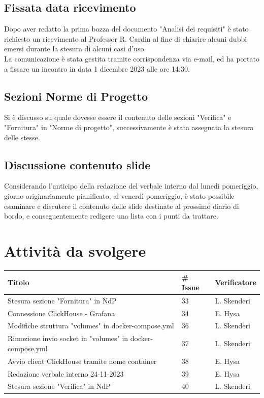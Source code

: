 \documentclass{article}
\begin{document}
    \subsection{Fissata data ricevimento}
        Dopo aver redatto la prima bozza del documento "Analisi dei requisiti" è stato richiesto un ricevimento al Professor R. Cardin al fine di chiarire alcuni dubbi emersi durante la stesura di alcuni casi d'uso. \\
        La comunicazione è stata gestita tramite corrispondenza via e-mail, ed ha portato a fissare un incontro in data 1 dicembre 2023 alle ore 14:30.

    \subsection{Sezioni Norme di Progetto}
        Si è discusso su quale dovesse essere il contenuto delle sezioni "Verifica" e "Fornitura" in "Norme di progetto", successivamente è stata assegnata la stesura delle stesse.
    
    \subsection{Discussione contenuto slide}
        Considerando l'anticipo della redazione del verbale interno dal lunedì pomeriggio, giorno originariamente pianificato, al venerdì pomeriggio, è stato possibile esaminare e discutere il contenuto delle slide destinate al prossimo diario di bordo, e conseguentemente redigere una lista con i punti da trattare.
        
\section{Attività da svolgere}
    \begin{center}
        \begin{tabular}{|C{7cm}|C{1,5cm}|C{3cm}|}
            \hline
            \textbf{Titolo} & \textbf{\# Issue} & \textbf{Verificatore} \\
            \hline\hline
            Stesura sezione "Fornitura" in NdP & 33 & L. Skenderi \\
            \hline
            Connessione ClickHouse - Grafana & 34 & E. Hysa \\
            \hline
            Modifiche struttura "volumes" in docker-compose.yml & 36 & L. Skenderi \\
            \hline
            Rimozione invio socket in "volumes" in docker-compose.yml & 37 & L. Skenderi \\
            \hline
            Avvio client ClickHouse tramite nome container & 38 & E. Hysa \\
            \hline
            Redazione verbale interno 24-11-2023 & 39 & E. Hysa \\
            \hline
            Stesura sezione "Verifica" in NdP & 40 & L. Skenderi \\
            \hline
        \end{tabular}
    \end{center}
\end{document}
